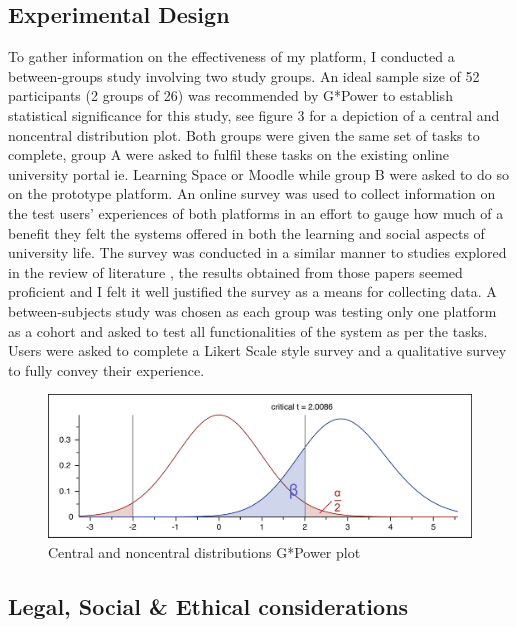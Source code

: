 \documentclass[lettersize,journal]{IEEEtran}
\begin{document}
        \subsection{Experimental Design}
        To gather information on the effectiveness of my platform, I conducted a between-groups study involving
	two study groups. An ideal sample size of 52 participants (2 groups of 26) was recommended by G*Power to establish statistical significance for this study, see figure 3 for a depiction of a
	central and noncentral distribution plot. Both groups were given the same set of tasks to complete, group A were asked to fulfil
        these tasks on the existing online university portal ie. Learning Space or Moodle while group B were asked to 
        do so on the prototype platform. An online survey was used to collect information on the test users' experiences
        of both platforms in an effort to gauge how much of a benefit they felt the systems offered in both the
        learning and social aspects of university life. The survey was conducted in a similar manner to
        studies explored in the review of literature \cite{Liu2010}\cite{Baruah2012}\cite{Wang2011}\cite{Evans2014}\cite{Akram et al 2017},
        the results obtained from those papers seemed proficient and I felt it well justified the survey as a means for collecting data.
        A between-subjects study was chosen as each group was testing only one platform as a cohort and asked to test all functionalities of
        the system as per the tasks. Users were asked to complete a Likert Scale style survey and a qualitative survey to fully convey their experience.
	        \begin{figure}[h!]
                \includegraphics[width=\linewidth]{images/gpowerplot.png}
                \caption{Central and noncentral distributions G*Power plot}
                \label{figure 3}
        \end{figure}
	\subsection{Legal, Social \& Ethical considerations}
\end{document}
